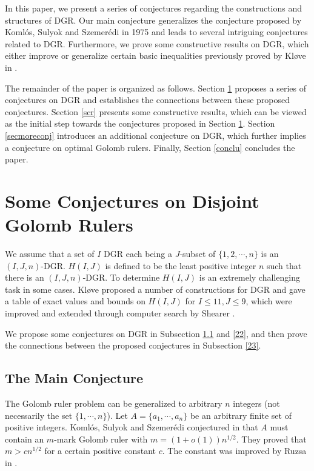 \documentclass[preprint,12pt]{elsarticle}
\begin{document}
In this paper, we present a series of conjectures regarding the constructions and structures of DGR. Our main conjecture generalizes the conjecture proposed by Koml{\'o}s, Sulyok and Szemer{\'e}di in 1975\cite{kssa1975} and leads to several intriguing conjectures related to DGR. Furthermore, we prove some constructive results on DGR, which either improve or generalize certain basic inequalities previously proved by Kl{\o}ve in \cite{Klove}.

The remainder of the paper is organized as follows. Section \ref{secmaincon} proposes a series of conjectures on DGR and establishes the connections between these proposed conjectures. Section \ref{scr} presents some constructive results, which can be viewed as the initial step towards the conjectures proposed in Section \ref{secmaincon}. Section \ref{secmoreconj} introduces an additional conjecture on DGR, which further implies a conjecture on optimal Golomb rulers. Finally, Section \ref{conclu} concludes the paper.


\section{Some Conjectures on Disjoint Golomb Rulers}\label{secmaincon}

We assume that a set of  $I$ DGR each being a $J$-subset of $\{1,2,\cdots, n\}$ is an $(I,J,n)$-DGR. $H(I, J)$ is defined to be the least positive integer $n$ such that there is an $(I,J,n)$-DGR. To determine $H(I,J)$ is an extremely challenging task in some cases. Kl{\o}ve\cite{Klove} proposed a number of constructions for DGR and gave a table of exact values and bounds on $H(I,J)$ for $I \leq 11, J \leq 9$, which were improved and extended through computer search by Shearer \cite{Shearer}.


We propose some conjectures on DGR in Subsection \ref{21} and \ref{22},
and then prove the connections between the proposed conjectures in Subsection \ref{23}.




\subsection{The Main Conjecture}\label{21}

The Golomb ruler problem can be generalized to arbitrary $n$ integers (not necessarily the set $\{1, \cdots,n\}$). Let $A = \{a_1, \cdots, a_n\}$ be an arbitrary finite set of positive integers. Koml{\'o}s, Sulyok and  Szemer{\'e}di  conjectured in \cite{kssa1975} that $A$ must contain an $m$-mark Golomb ruler with $m = (1+o(1))n^{1/2}$. They proved that $m > cn^{1/2}$ for a certain positive constant $c$. The constant was improved by Ruzsa in \cite{RuzsaII1995}.
\end{document}
